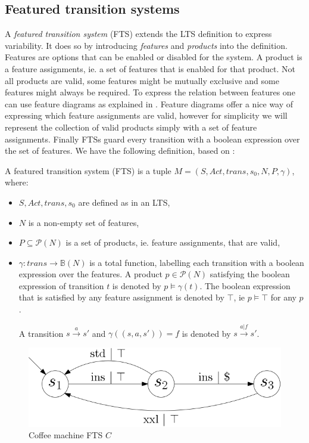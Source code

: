 \subsection{Featured transition systems}
A \textit{featured transition system} (FTS) extends the LTS definition to express variability. It does so by introducing \textit{features} and \textit{products} into the definition. Features are options that can be enabled or disabled for the system. A product is a feature assignments, ie. a set of features that is enabled for that product. Not all products are valid, some features might be mutually exclusive and some features might always be required. To express the relation between features one can use feature diagrams as explained in \cite{Classen2013FeaturedTS}. Feature diagrams offer a nice way of expressing which feature assignments are valid, however for simplicity we will represent the collection of valid products simply with a set of feature assignments. Finally FTSs guard every transition with a boolean expression over the set of features. We have the following definition, based on \cite{Classen2013FeaturedTS}:
\begin{definition}
	\label{def_fts}A featured transition system (FTS) is a tuple $M = (S, Act, trans, s_0, N, P, \gamma)$, where:
	\begin{itemize}
		\item $S, Act, trans, s_0$ are defined as in an LTS,
		\item $N$ is a non-empty set of features,
		\item $P \subseteq \mathcal{P}(N)$ is a set of products, ie. feature assignments, that are valid,
		\item $\gamma : trans \rightarrow \mathbb{B}(N)$ is a total function, labelling each transition with a boolean expression over the features. A product $p \in \mathcal{P}(N)$ satisfying the boolean expression of transition $t$ is denoted by $p \models \gamma(t)$. The boolean expression that is satisfied by any feature assignment is denoted by $\top$, ie $p \models \top$ for any $p$.
		
		A transition $s \xrightarrow a s'$ and $\gamma((s,a,s')) = f$ is denoted by $s \xrightarrow {a | f} s'$. 
	\end{itemize}
\end{definition}
\begin{figure}[h]
\centering
\includegraphics[scale=0.3]{Examples/CoffeeMachine/FTS}
\caption[Coffee machine LTS]{Coffee machine FTS $C$}
\label{fig:coffeemachinefts}
\end{figure}

